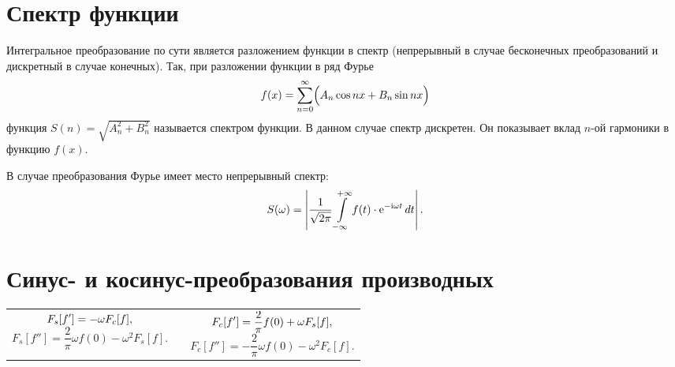 \section{Спектр функции}
Интегральное преобразование по сути является разложением функции в спектр
(непрерывный в случае бесконечных преобразований и дискретный в случае
конечных). Так, при разложении функции в ряд Фурье
\[
   f(x) = \sum\limits_{n=0}^\infty \Bigl(A_n\cos nx + B_n\sin nx\Bigr)
\]
функция \( S(n) = \sqrt{A_n^2 + B_n^2} \) называется спектром функции. В данном
случае спектр дискретен. Он показывает вклад \( n \)-ой гармоники в функцию
\( f(x) \).

В случае преобразования Фурье имеет место непрерывный спектр:
\[
    S(\omega) = \left|\frac{1}{\sqrt{2\pi}}\int\limits_{-\infty}^{+\infty} f(t)
    \cdot\mathrm{e}^{-\mathrm{i}\omega t}\,dt\right|.
\]

\section{Синус- и косинус-преобразования производных}
\begin{table}[h!]
    \begin{tabular}{C{.47}cC{.47}}
        \( \displaystyle
            F_s[f'] = -\omega F_c[f],
        \)
        \[
            F_s[f''] = \frac{2}{\pi}\omega f(0) - \omega^2 F_s[f].
        \] & \hfill &
        \( \displaystyle
            F_c[f'] = \frac{2}{\pi}f(0) + \omega F_s[f],
        \)
        \[
            F_c[f''] = -\frac{2}{\pi}\omega f(0) - \omega^2 F_c[f].
        \] 
    \end{tabular}
\end{table}
\newpage
